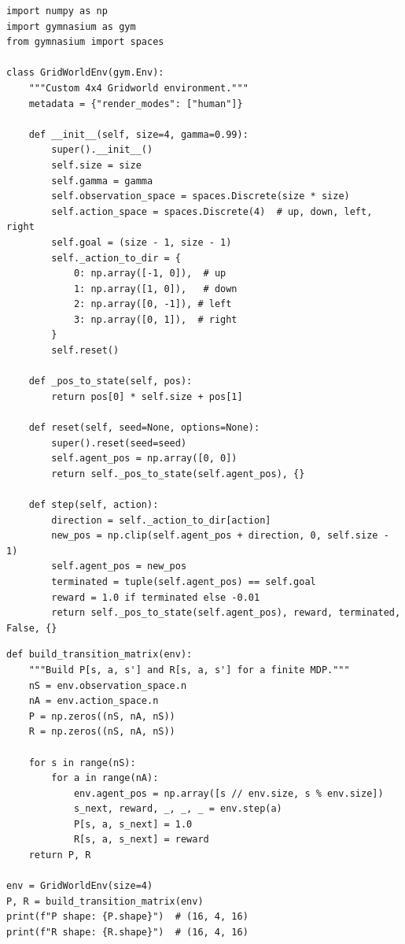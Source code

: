 \begin{codeblock}[title=\textbf{Defining a Simple MDP with Gymnasium}]
\begin{verbatim}
import numpy as np
import gymnasium as gym
from gymnasium import spaces

class GridWorldEnv(gym.Env):
    """Custom 4x4 Gridworld environment."""
    metadata = {"render_modes": ["human"]}

    def __init__(self, size=4, gamma=0.99):
        super().__init__()
        self.size = size
        self.gamma = gamma
        self.observation_space = spaces.Discrete(size * size)
        self.action_space = spaces.Discrete(4)  # up, down, left, right
        self.goal = (size - 1, size - 1)
        self._action_to_dir = {
            0: np.array([-1, 0]),  # up
            1: np.array([1, 0]),   # down
            2: np.array([0, -1]), # left
            3: np.array([0, 1]),  # right
        }
        self.reset()

    def _pos_to_state(self, pos):
        return pos[0] * self.size + pos[1]

    def reset(self, seed=None, options=None):
        super().reset(seed=seed)
        self.agent_pos = np.array([0, 0])
        return self._pos_to_state(self.agent_pos), {}

    def step(self, action):
        direction = self._action_to_dir[action]
        new_pos = np.clip(self.agent_pos + direction, 0, self.size - 1)
        self.agent_pos = new_pos
        terminated = tuple(self.agent_pos) == self.goal
        reward = 1.0 if terminated else -0.01
        return self._pos_to_state(self.agent_pos), reward, terminated, False, {}
\end{verbatim}
\end{codeblock}

\begin{codeblock}[title=\textbf{Building the Transition Matrix}]
\begin{verbatim}
def build_transition_matrix(env):
    """Build P[s, a, s'] and R[s, a, s'] for a finite MDP."""
    nS = env.observation_space.n
    nA = env.action_space.n
    P = np.zeros((nS, nA, nS))
    R = np.zeros((nS, nA, nS))

    for s in range(nS):
        for a in range(nA):
            env.agent_pos = np.array([s // env.size, s % env.size])
            s_next, reward, _, _, _ = env.step(a)
            P[s, a, s_next] = 1.0
            R[s, a, s_next] = reward
    return P, R

env = GridWorldEnv(size=4)
P, R = build_transition_matrix(env)
print(f"P shape: {P.shape}")  # (16, 4, 16)
print(f"R shape: {R.shape}")  # (16, 4, 16)
\end{verbatim}
\end{codeblock}

